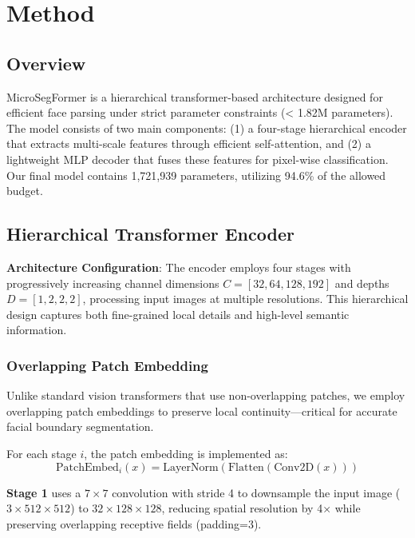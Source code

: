 \section{Method}
\label{sec:method}

\subsection{Overview}

MicroSegFormer is a hierarchical transformer-based architecture designed for efficient face parsing under strict parameter constraints (< 1.82M parameters). The model consists of two main components: (1) a four-stage hierarchical encoder that extracts multi-scale features through efficient self-attention, and (2) a lightweight MLP decoder that fuses these features for pixel-wise classification. Our final model contains 1,721,939 parameters, utilizing 94.6\% of the allowed budget.

\subsection{Hierarchical Transformer Encoder}

\textbf{Architecture Configuration}: The encoder employs four stages with progressively increasing channel dimensions $C = [32, 64, 128, 192]$ and depths $D = [1, 2, 2, 2]$, processing input images at multiple resolutions. This hierarchical design captures both fine-grained local details and high-level semantic information.

\subsubsection{Overlapping Patch Embedding}

Unlike standard vision transformers that use non-overlapping patches, we employ overlapping patch embeddings to preserve local continuity—critical for accurate facial boundary segmentation.

For each stage $i$, the patch embedding is implemented as:
\begin{equation}
\text{PatchEmbed}_i(x) = \text{LayerNorm}(\text{Flatten}(\text{Conv2D}(x)))
\end{equation}

\textbf{Stage 1} uses a $7\times7$ convolution with stride 4 to downsample the input image ($3\times512\times512$) to $32\times128\times128$, reducing spatial resolution by 4× while preserving overlapping receptive fields (padding=3).

